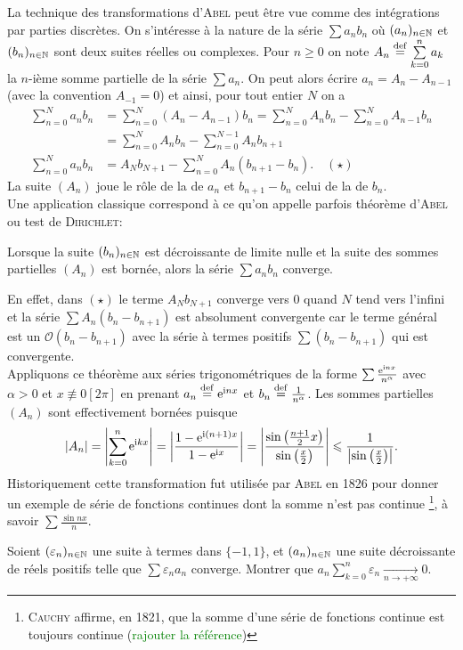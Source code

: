 La technique des transformations d'\textsc{Abel} peut être vue comme des intégrations par parties discrètes. On s'intéresse à la nature de la série $\sum a_n b_n$ où $(a_n)_{n \in \mathbb{N}}$ et $(b_n)_{n \in \mathbb{N}}$ sont deux suites réelles ou complexes. Pour $n \geqslant 0$ on note $A_n \overset{\mathrm{\tiny def}}{=} \sum\limits_{k=0}^n a_k$ la $n$-ième somme partielle de la série $\sum a_n$. On peut alors écrire $a_n = A_n - A_{n-1}$ (avec la convention $A_{-1} = 0$) et ainsi, pour tout entier $N$ on a
\begin{align*}
    \sum_{n=0}^N a_n b_n &= \sum_{n=0}^N (A_n - A_{n-1})b_n =  \sum_{n=0}^N A_n b_n -  \sum_{n=0}^N A_{n-1}b_n \\
    &= \sum_{n=0}^N A_n b_n - \sum_{n=0}^{N-1} A_n b_{n+1} \\
    \sum_{n=0}^N a_n b_n &= A_N b_{N+1} - \sum_{n=0}^N A_n(b_{n+1}-b_n). \quad (\star)
\end{align*}
La suite $(A_n)$ joue le rôle de la  de $a_n$ et $b_{n+1} - b_n$ celui de la  de $b_n$. \\
Une application classique correspond à ce qu'on appelle parfois théorème d'\textsc{Abel} ou test de \textsc{Dirichlet}: 
\begin{theo}{}
    Lorsque la suite $(b_n)_{n \in \mathbb{N}}$ est décroissante de limite nulle et la suite des sommes partielles $(A_n)$ est bornée, alors la série $\sum a_n b_n$ converge.
\end{theo}

En effet, dans $(\star)$ le terme $A_N b_{N+1}$ converge vers $0$ quand $N$ tend vers l'infini et la série $\sum A_n(b_n - b_{n+1})$ est absolument convergente car le terme général est un $\mathcal{O}(b_n - b_{n+1})$ avec la série à termes positifs $\sum(b_n - b_{n+1})$ qui est convergente. \\
Appliquons ce théorème aux séries trigonométriques de la forme $\sum \frac{\mathrm{e}^{\mathrm{i} n x}}{n^\alpha}$ avec $\alpha > 0$ et $x \not \equiv 0 [2\pi]$ en prenant $a_n \overset{\mathrm{\tiny def}}{=} \mathrm{e}^{\mathrm{i} n x}$ et $b_n \overset{\mathrm{\tiny def}}{=} \frac{1}{n^\alpha}$. Les sommes partielles $(A_n)$ sont effectivement bornées puisque
$$|A_n| = \left| \sum_{k=0}^n \mathrm{e}^{\mathrm{i} k x}\right| = \left| \frac{1 - \mathrm{e}^{\mathrm{i} (n+1)x}}{1-\mathrm{e}^{\mathrm{i} x}} \right| = \left| \frac{\sin \left( \frac{n+1}{2} x\right)}{\sin \left( \frac{x}{2} \right)} \right| \leqslant \frac{1}{\left| \sin \left( \frac{x}{2} \right) \right|}.$$
Historiquement cette transformation fut utilisée par \textsc{Abel} en 1826 pour donner un exemple de série de fonctions continues dont la somme n'est pas continue \footnote{\textsc{Cauchy} affirme, en 1821, que la somme d'une série de fonctions continue est toujours continue (\textcolor{green}{rajouter la référence})}, à savoir $\sum \frac{\sin nx}{n}$.

\begin{exercice}
    Soient $(\varepsilon_n)_{n \in \mathbb{N}}$ une suite à termes dans $\{-1, 1\}$, et $(a_n)_{n \in \mathbb{N}}$ une suite décroissante de réels positifs telle que $\sum \varepsilon_n a_n$ converge. Montrer que $a_n \sum\limits_{k=0}^{n} \varepsilon_n \xrightarrow[n \to + \infty]{} 0$.
\end{exercice}
   
